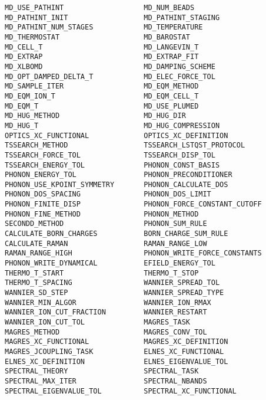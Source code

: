 \documentclass[a4paper, 10pt]{article}
\begin{document}
\begin{lstlisting}[numbers=right]
MD_USE_PATHINT                   MD_NUM_BEADS                    
MD_PATHINT_INIT                  MD_PATHINT_STAGING              
MD_PATHINT_NUM_STAGES            MD_TEMPERATURE                  
MD_THERMOSTAT                    MD_BAROSTAT                     
MD_CELL_T                        MD_LANGEVIN_T                   
MD_EXTRAP                        MD_EXTRAP_FIT                   
MD_XLBOMD                        MD_DAMPING_SCHEME               
MD_OPT_DAMPED_DELTA_T            MD_ELEC_FORCE_TOL               
MD_SAMPLE_ITER                   MD_EQM_METHOD                   
MD_EQM_ION_T                     MD_EQM_CELL_T                   
MD_EQM_T                         MD_USE_PLUMED                   
MD_HUG_METHOD                    MD_HUG_DIR                      
MD_HUG_T                         MD_HUG_COMPRESSION              
OPTICS_XC_FUNCTIONAL             OPTICS_XC_DEFINITION            
TSSEARCH_METHOD                  TSSEARCH_LSTQST_PROTOCOL        
TSSEARCH_FORCE_TOL               TSSEARCH_DISP_TOL               
TSSEARCH_ENERGY_TOL              PHONON_CONST_BASIS              
PHONON_ENERGY_TOL                PHONON_PRECONDITIONER           
PHONON_USE_KPOINT_SYMMETRY       PHONON_CALCULATE_DOS            
PHONON_DOS_SPACING               PHONON_DOS_LIMIT                
PHONON_FINITE_DISP               PHONON_FORCE_CONSTANT_CUTOFF    
PHONON_FINE_METHOD               PHONON_METHOD                   
SECONDD_METHOD                   PHONON_SUM_RULE                 
CALCULATE_BORN_CHARGES           BORN_CHARGE_SUM_RULE            
CALCULATE_RAMAN                  RAMAN_RANGE_LOW                 
RAMAN_RANGE_HIGH                 PHONON_WRITE_FORCE_CONSTANTS    
PHONON_WRITE_DYNAMICAL           EFIELD_ENERGY_TOL               
THERMO_T_START                   THERMO_T_STOP                   
THERMO_T_SPACING                 WANNIER_SPREAD_TOL              
WANNIER_SD_STEP                  WANNIER_SPREAD_TYPE             
WANNIER_MIN_ALGOR                WANNIER_ION_RMAX                
WANNIER_ION_CUT_FRACTION         WANNIER_RESTART                 
WANNIER_ION_CUT_TOL              MAGRES_TASK                     
MAGRES_METHOD                    MAGRES_CONV_TOL                 
MAGRES_XC_FUNCTIONAL             MAGRES_XC_DEFINITION            
MAGRES_JCOUPLING_TASK            ELNES_XC_FUNCTIONAL             
ELNES_XC_DEFINITION              ELNES_EIGENVALUE_TOL            
SPECTRAL_THEORY                  SPECTRAL_TASK                   
SPECTRAL_MAX_ITER                SPECTRAL_NBANDS                 
SPECTRAL_EIGENVALUE_TOL          SPECTRAL_XC_FUNCTIONAL          

\end{lstlisting}
\end{document}
